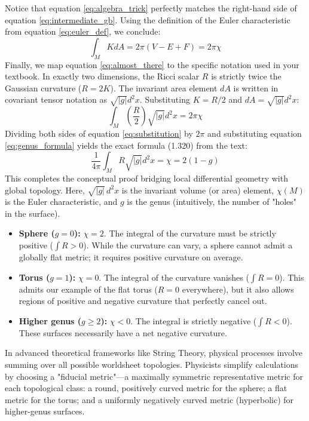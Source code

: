 \documentclass[11pt, a4paper]{report}
\begin{document}
Notice that equation \eqref{eq:algebra_trick} perfectly matches the right-hand side of equation \eqref{eq:intermediate_gb}. Using the definition of the Euler characteristic from equation \eqref{eq:euler_def}, we conclude:
\begin{equation} \int_M K dA = 2\pi(V - E + F) = 2\pi \chi \label{eq:almost_there} \end{equation}
Finally, we map equation \eqref{eq:almost_there} to the specific notation used in your textbook. In exactly two dimensions, the Ricci scalar $R$ is strictly twice the Gaussian curvature ($R = 2K$). The invariant area element $dA$ is written in covariant tensor notation as $\sqrt{|g|} d^2x$. Substituting $K = R/2$ and $dA = \sqrt{|g|} d^2x$:
\begin{equation} \int_M \left(\frac{R}{2}\right) \sqrt{|g|} d^2x = 2\pi \chi \label{eq:substitution} \end{equation}
Dividing both sides of equation \eqref{eq:substitution} by $2\pi$ and substituting equation \eqref{eq:genus_formula} yields the exact formula (1.320) from the text:
\begin{equation} \frac{1}{4\pi} \int_M R \sqrt{|g|} d^2x = \chi = 2(1-g) \label{eq:final_proof} \end{equation}
This completes the conceptual proof bridging local differential geometry with global topology.
Here, $\sqrt{|g|} \, d^2x$ is the invariant volume (or area) element, $\chi(M)$ is the Euler characteristic, and $g$ is the genus (intuitively, the number of "holes" in the surface).
\begin{itemize}
    \item \textbf{Sphere ($g=0$):} $\chi = 2$. The integral of the curvature must be strictly positive ($\int R > 0$). While the curvature can vary, a sphere cannot admit a globally flat metric; it requires positive curvature on average.
    \item \textbf{Torus ($g=1$):} $\chi = 0$. The integral of the curvature vanishes ($\int R = 0$). This admits our example of the flat torus ($R=0$ everywhere), but it also allows regions of positive and negative curvature that perfectly cancel out.
    \item \textbf{Higher genus ($g \geq 2$):} $\chi < 0$. The integral is strictly negative ($\int R < 0$). These surfaces necessarily have a net negative curvature.
\end{itemize}
In advanced theoretical frameworks like String Theory, physical processes involve summing over all possible worldsheet topologies. Physicists simplify calculations by choosing a "fiducial metric"—a maximally symmetric representative metric for each topological class: a round, positively curved metric for the sphere; a flat metric for the torus; and a uniformly negatively curved metric (hyperbolic) for higher-genus surfaces.
\end{document}
